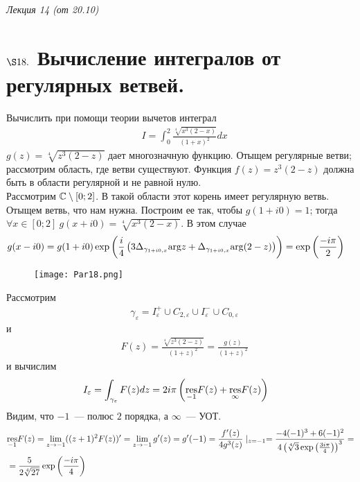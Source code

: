 \begin{flushright}
    \textit{Лекция 14 (от 20.10)}
\end{flushright}
\section{$\S 18.$ Вычисление интегралов от регулярных ветвей.}
\Example
Вычислить при помощи теории вычетов интеграл
\begin{align*}
  & I = \int_0^2 \frac{\sqrt[4]{x^3(2-x)}}{(1+x)^2} dx
\end{align*}
\nonum
$g(z) = \sqrt[4]{z^3(2-z)}$ дает многозначную функцию. Отыщем регулярные ветви;
рассмотрим область, где ветви существуют. Функция $f(z) = z^3(2-z)$ должна быть
в области регулярной и не равной нулю.
\\
Рассмотрим $\mathbb{C} \setminus [0;2]$. В такой области этот корень имеет регулярную
ветвь.
\\
Отыщем ветвь, что нам нужна. Построим ее так, чтобы $g(1+i0) = 1$; тогда
$\forall x \in [0;2] \ g(x+i0) = \sqrt[4]{x^3(2-x)}$. В этом случае
\begin{align*}
  & g(x-i0) = g(1+i0)\exp\left( \frac{i}{4}\left( 3\Delta_{\gamma_{1+i0,x}}\mathrm{arg} z + \Delta_{\gamma_{1+i0,x}}\mathrm{arg} (2-z) \right) \right) = \exp\left( \frac{-i\pi}{2}\right)
\end{align*}
\begin{figure}[h!]
		\centering
		\texttt{[image: Par18.png]}
		\label{fig:18.1}
\end{figure}
Рассмотрим
\begin{align*}
  & \gamma_\varepsilon = I_\varepsilon^+\cup C_{2, \varepsilon} \cup I_\varepsilon^-\cup C_{0, \varepsilon}
\end{align*}
и
\begin{align*}
  & F(z) = \frac{\sqrt[4]{z^3(2-z)}}{(1+z)^2} = \frac{g(z)}{(1+z)^2}
\end{align*}
и вычислим
\begin{align*}
  & I_\varepsilon = \int_{\gamma_\varepsilon}F(z) dz = 2 i \pi \left( \underset{-1}{\mathrm{res}} F(z) + \underset{\infty}{\mathrm{res}} F(z) \right)
\end{align*}
Видим, что $-1$~--- полюс $2$ порядка, а $\infty$~--- УОТ.
\begin{align*}
  & \underset{-1}{\mathrm{res}} F(z) = \lim_{z \to -1}((z+1)^2F(z))' = \lim_{z \to -1}g'(z) = g'(-1) = \frac{f'(z)}{4g^3(z)}\mid_{z = -1} = \frac{-4(-1)^3+6(-1)^2}{4\left( \sqrt[4]{3}\exp\left( \frac{3i\pi}{4} \right)\right)^3} = \\
  & = \frac{5}{2\sqrt[4]{27}}\exp\left( \frac{-i\pi}{4} \right)
\end{align*}
